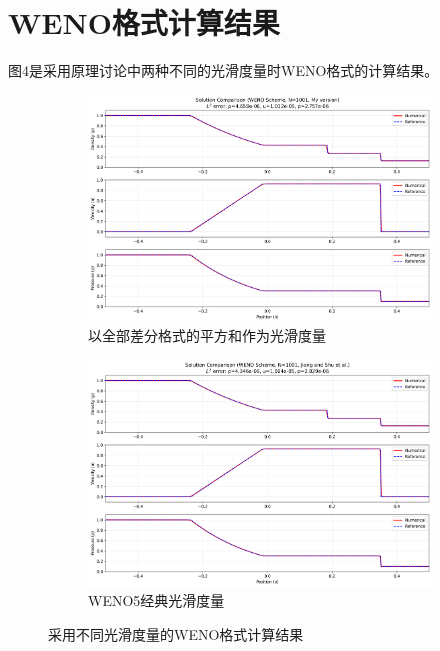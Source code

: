 \documentclass[12pt, a4paper]{article}
\begin{document}
\section{WENO格式计算结果}
图4是采用原理讨论中两种不同的光滑度量时WENO格式的计算结果。
\begin{figure}[htbp]
    \centering
    \begin{subfigure}[b]{0.45\textwidth} 
        \centering
        \includegraphics[width=\textwidth]{./pictures/Solution Comparison (WENO Scheme, N=1001, My version).png} 
        \caption{以全部差分格式的平方和作为光滑度量}
    \end{subfigure}
    \hfill
    \begin{subfigure}[b]{0.45\textwidth} 
        \centering
        \includegraphics[width=\textwidth]{./pictures/Solution Comparison (WENO Scheme, N=1001, Jiang and Shu et al.).png} 
        \caption{WENO5经典光滑度量}
    \end{subfigure}
    \vspace{0.5cm}
    \caption{采用不同光滑度量的WENO格式计算结果}
\end{figure}
\end{document}
